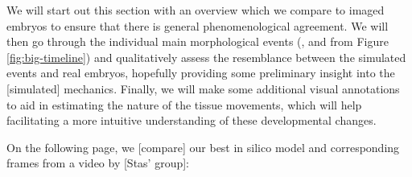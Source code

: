We will start out this section with an overview which we compare to imaged embryos to ensure that there is general phenomenological agreement. We will then go through the individual main morphological events (,  and  from Figure \ref{fig:big-timeline}) and qualitatively assess the resemblance between the simulated events and real embryos, hopefully providing some preliminary insight into the [simulated] mechanics. Finally, we will make some additional visual annotations to aid in estimating the nature of the tissue movements, which will help facilitating a more intuitive understanding of these developmental changes.

On the following page, we [compare] our best in silico model and corresponding frames from a video by [Stas' group]: 
\newpage

